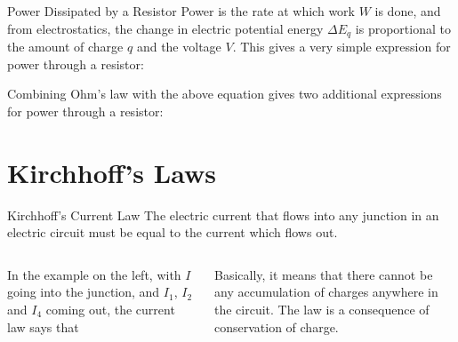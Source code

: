 \documentclass[12pt,aspectratio=169]{beamer}
\begin{document}
\begin{frame}{Power Dissipated by a Resistor}
  Power is the rate at which work $W$ is done, and from electrostatics, the
  change in electric potential energy $\Delta E_q$ is proportional to the
  amount of charge $q$ and the voltage $V$. This gives a very simple expression
  for power through a resistor:
  

  Combining Ohm's law with the above equation gives two additional expressions
  for power through a resistor:

\end{frame}


\section{Kirchhoff's Laws}

\begin{frame}{Kirchhoff's Current Law}
  The electric current that flows into any junction in an electric circuit must
  be equal to the current which flows out.

  \vspace{.2in}
  \begin{columns}

    In the example on the left, with $I$ going into the junction, and $I_1$,
    $I_2$ and $I_4$ coming out, the current law says that


    Basically, it means that there cannot be any accumulation of charges
    anywhere in the circuit. The law is a consequence of conservation of charge.
  \end{columns}
\end{frame}
\end{document}
